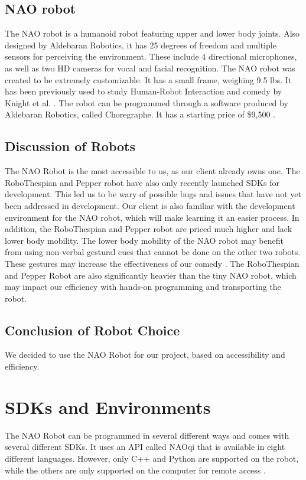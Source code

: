 \documentclass[onecolumn, draftclsnofoot,10pt, compsoc]{IEEEtran}
\begin{document}
\subsection{NAO robot}
The NAO robot is a humanoid robot featuring upper and lower body joints.
Also designed by Aldebaran Robotics, it has 25 degrees of freedom and multiple sensors for perceiving the environment.
These include 4 directional microphones, as well as two HD cameras for vocal and facial recognition.
The NAO robot was created to be extremely customizable.
It has a small frame, weighing 9.5 lbs.
It has been previously used to study Human-Robot Interaction and comedy by Knight et al. \cite{KnightSavvy:2011}.
The robot can be programmed through a software produced by Aldebaran Robotics, called Choregraphe.
It has a starting price of \$9,500 \cite{BuyNAO}. \cite{NAORobot}

\subsection{Discussion of Robots}
The NAO Robot is the most accessible to us, as our client already owns one.
The RoboThespian and Pepper robot have also only recently launched SDKs for development.
This led us to be wary of possible bugs and issues that have not yet been addressed in development.
Our client is also familiar with the development environment for the NAO robot, which will make learning it an easier process.
In addition, the RoboThespian and Pepper robot are priced much higher and lack lower body mobility.
The lower body mobility of the NAO robot may benefit from using non-verbal gestural cues that cannot be done on the other two robots.
These gestures may increase the effectiveness of our comedy \cite{KnightEightLessons:2011}.
The RoboThespian and Pepper Robot are also significantly heavier than the tiny NAO robot, which may impact our efficiency with hands-on programming and transporting the robot.

\subsection{Conclusion of Robot Choice}
We decided to use the NAO Robot for our project, based on accessibility and efficiency.

\section{SDKs and Environments}
The NAO Robot can be programmed in several different ways and comes with several different SDKs. It uses an API called NAOqi that is available in eight different languages. However, only C++ and Python are supported on the robot, while the others are only supported on the computer for remote access \cite{NAOSDK:Overview}.
\end{document}
